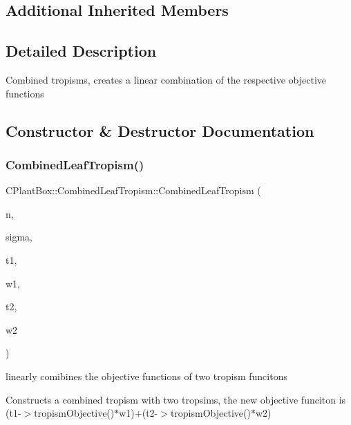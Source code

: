 \subsection*{Additional Inherited Members}


\subsection{Detailed Description}
Combined tropisms, creates a linear combination of the respective objective functions 

\subsection{Constructor \& Destructor Documentation}
\mbox{\label{classCPlantBox_1_1CombinedLeafTropism_a932f5340663a5785b31f4013fe0132aa}} 
\subsubsection{\texorpdfstring{Combined\+Leaf\+Tropism()}{CombinedLeafTropism()}}
{\footnotesize\ttfamily C\+Plant\+Box\+::\+Combined\+Leaf\+Tropism\+::\+Combined\+Leaf\+Tropism (\begin{DoxyParamCaption}\item[{double}]{n,  }\item[{double}]{sigma,  }\item[{\hyperlink{classCPlantBox_1_1LeafTropismFunction}{Leaf\+Tropism\+Function} $\ast$}]{t1,  }\item[{double}]{w1,  }\item[{\hyperlink{classCPlantBox_1_1LeafTropismFunction}{Leaf\+Tropism\+Function} $\ast$}]{t2,  }\item[{double}]{w2 }\end{DoxyParamCaption})}



linearly comibines the objective functions of two tropism funcitons 

Constructs a combined tropism with two tropsims, the new objective funciton is (t1-\/$>$tropism\+Objective()$\ast$w1)+(t2-\/$>$tropism\+Objective()$\ast$w2)


